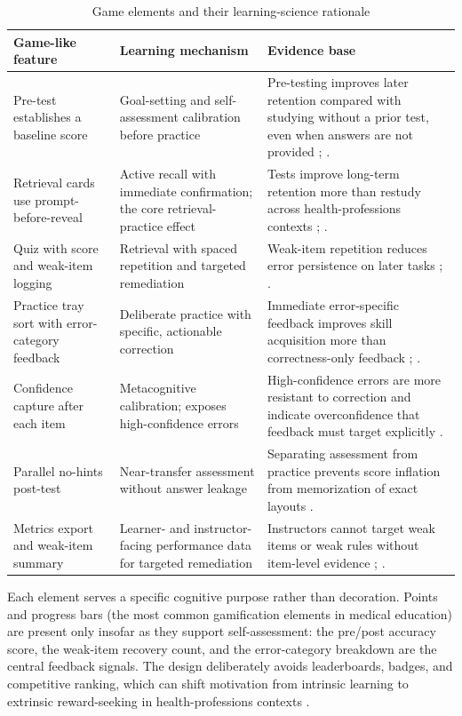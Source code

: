\documentclass[10pt,a4paper]{article}
\begin{document}
\begin{table}[H]
\centering
\caption{Game elements and their learning-science rationale}
\label{tab:game-elements-and-their-learning-science-rationale}
\small\renewcommand{\arraystretch}{1.2}\setlength{\tabcolsep}{4pt}
\begin{tabularx}{\textwidth}{|>{\raggedright\arraybackslash}X|>{\raggedright\arraybackslash}X|>{\raggedright\arraybackslash}X|}
\hline
Game-like feature & Learning mechanism & Evidence base \\
\hline
Pre-test establishes a baseline score & Goal-setting and self-assessment calibration before practice & Pre-testing improves later retention compared with studying without a prior test, even when answers are not provided \cite{roediger-and-karpicke-2006}; \cite{larsen-et-al-2009}. \\
\hline
Retrieval cards use prompt-before-reveal & Active recall with immediate confirmation; the core retrieval-practice effect & Tests improve long-term retention more than restudy across health-professions contexts \cite{dunlosky-et-al-2013}; \cite{barrison-et-al-2025}. \\
\hline
Quiz with score and weak-item logging & Retrieval with spaced repetition and targeted remediation & Weak-item repetition reduces error persistence on later tasks \cite{ofstead-et-al-2023}; \cite{hattie-and-timperley-2007}. \\
\hline
Practice tray sort with error-category feedback & Deliberate practice with specific, actionable correction & Immediate error-specific feedback improves skill acquisition more than correctness-only feedback \cite{hattie-and-timperley-2007}; \cite{issenberg-et-al-2005}. \\
\hline
Confidence capture after each item & Metacognitive calibration; exposes high-confidence errors & High-confidence errors are more resistant to correction and indicate overconfidence that feedback must target explicitly \cite{ofstead-et-al-2023}. \\
\hline
Parallel no-hints post-test & Near-transfer assessment without answer leakage & Separating assessment from practice prevents score inflation from memorization of exact layouts \cite{bell-et-al-2008}. \\
\hline
Metrics export and weak-item summary & Learner- and instructor-facing performance data for targeted remediation & Instructors cannot target weak items or weak rules without item-level evidence \cite{kovach-2012}; \cite{nichol-et-al-2024}. \\
\hline
\end{tabularx}
\end{table}
Each element serves a specific cognitive purpose rather than decoration.
Points and progress bars (the most common gamification elements in medical
education) are present only insofar as they support self-assessment: the
pre/post accuracy score, the weak-item recovery count, and the error-category
breakdown are the central feedback signals. The design deliberately avoids
leaderboards, badges, and competitive ranking, which can shift motivation from
intrinsic learning to extrinsic reward-seeking in health-professions contexts
\cite{van-gaalen-et-al-2021}.
\end{document}
